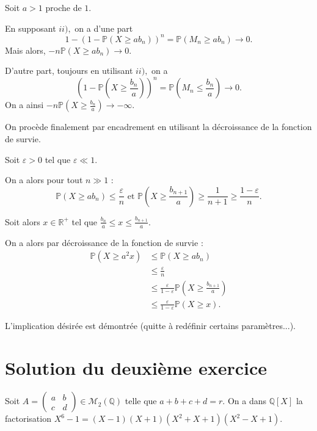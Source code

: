 Soit $a>1$ proche de $1.$ 

En supposant $ii),$ on a d'une part $$1-\left(1-\mathbb{P}(X\geq ab_{n})\right)^{n}=\mathbb{P}(M_{n}\geq ab_{n})\longrightarrow 0.$$
Mais alors, $\displaystyle -n\mathbb{P}(X\geq ab_{n})\longrightarrow 0.$ 


D'autre part, toujours en utilisant $ii),$ on a $$\left(1-\mathbb{P}(X\geq \frac{b_{n}}{a})\right)^{n}=\mathbb{P}(M_{n}\leq \frac{b_{n}}{a})\longrightarrow 0.$$
On a ainsi $\displaystyle -n\mathbb{P}(X\geq \frac{b_{n}}{a})\longrightarrow -\infty.$

On procède finalement par encadrement en utilisant la décroissance de la fonction de survie.

Soit $\varepsilon>0$ tel que $\varepsilon\ll 1.$ 

On a alors pour tout $n\gg 1$ : $$\mathbb{P}(X\geq ab_{n})\leq \frac{\varepsilon}{n} \mbox{ et } \mathbb{P}(X\geq \frac{b_{n+1}}{a})\geq \frac{1}{n+1}\geq \frac{1-\varepsilon}{n}.$$

Soit alors $x\in\mathbb{R}^{+}$ tel que $\displaystyle \frac{b_{n}}{a}\leq x\leq \frac{b_{n+1}}{a}.$

On a alors par décroissance de la fonction de survie :
\begin{align*}
\mathbb{P}(X\geq a^{2}x) & \leq \mathbb{P}(X\geq ab_{n})\\
& \leq \frac{\varepsilon}{n}\\
& \leq \frac{\varepsilon}{1-\varepsilon}\mathbb{P}(X\geq \frac{b_{n+1}}{a})\\
& \leq \frac{\varepsilon}{1-\varepsilon}\mathbb{P}(X\geq x).
\end{align*}

L'implication désirée est démontrée (quitte à redéfinir certains paramètres...).
\section {Solution du deuxième exercice}%
Soit $A = \begin{pmatrix} a&b\\c&d \end{pmatrix} \in \mathcal M_2(\mathbb Q) $  telle que $a+b+c+d = r.$ On a dans $\mathbb Q[X]$ la factorisation $X^6-1 =(X-1)(X+1)(X^2+X+1)(X^2-X+1).$

